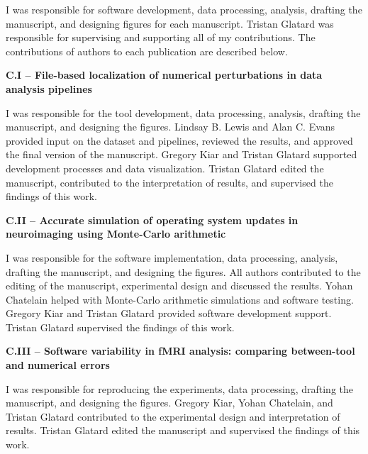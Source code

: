 \begin{authorcontributions}

I was responsible for software development, data processing, analysis, drafting the manuscript, and designing figures for each manuscript. 
Tristan Glatard was responsible for supervising and supporting all of my contributions.
The contributions of authors to each publication are described below.

\textbf{C.I – File-based localization of numerical perturbations in data analysis pipelines}

I was responsible for the tool development, data processing, analysis, drafting the manuscript, and designing the figures.
Lindsay B. Lewis and Alan C. Evans provided input on the dataset and pipelines, reviewed the results, and approved the final version of the manuscript.
Gregory Kiar and Tristan Glatard supported development processes and data visualization.
Tristan Glatard edited the manuscript, contributed to the interpretation of results, and supervised the findings of this work.

\textbf{C.II – Accurate simulation of operating system updates in neuroimaging using Monte-Carlo arithmetic}

I was responsible for the software implementation, data processing, analysis, drafting the manuscript, and designing the figures.
All authors contributed to the editing of the manuscript, experimental design and discussed the results.
Yohan Chatelain helped with Monte-Carlo arithmetic simulations and software testing.
Gregory Kiar and Tristan Glatard provided software development support.
Tristan Glatard supervised the findings of this work.

\textbf{C.III – Software variability in fMRI analysis: comparing between-tool and numerical errors}

I was responsible for reproducing the experiments, data processing, drafting the manuscript, and designing the figures.
Gregory Kiar, Yohan Chatelain, and Tristan Glatard contributed to the experimental design and interpretation of results.
Tristan Glatard edited the manuscript and supervised the findings of this work.

\end{authorcontributions}